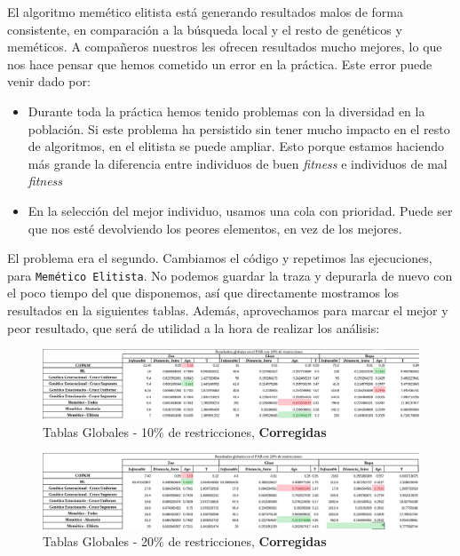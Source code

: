 \documentclass[11pt]{article}
\begin{document}
El algoritmo memético elitista está generando resultados malos de forma consistente, en comparación a la búsqueda local y el resto de genéticos y meméticos. A compañeros nuestros les ofrecen resultados mucho mejores, lo que nos hace pensar que hemos cometido un error en la práctica. Este error puede venir dado por:

\begin{itemize}
    \item Durante toda la práctica hemos tenido problemas con la diversidad en la población. Si este problema ha persistido sin tener mucho impacto en el resto de algoritmos, en el elitista se puede ampliar. Esto porque estamos haciendo más grande la diferencia entre individuos de buen \emph{fitness} e individuos de mal \emph{fitness}
    \item En la selección del mejor individuo, usamos una cola con prioridad. Puede ser que nos esté devolviendo los peores elementos, en vez de los mejores.
\end{itemize}

El problema era el segundo. Cambiamos el código y repetimos las ejecuciones, para \lstinline{Memético Elitista}. No podemos guardar la traza y depurarla de nuevo con el poco tiempo del que disponemos, así que directamente mostramos los resultados en la siguientes tablas. Además, aprovechamos para marcar el mejor y peor resultado, que será de utilidad a la hora de realizar los análisis:

\begin{figure}[H]
    \includegraphics[width=1.0\textwidth]{tablas_globales_corregidas_10}
    \caption{Tablas Globales - 10\% de restricciones, \textbf{Corregidas}}
\end{figure}

\begin{figure}[H]
    \includegraphics[width=1.0\textwidth]{tablas_globales_corregidas_20}
    \caption{Tablas Globales - 20\% de restricciones, \textbf{Corregidas}}
\end{figure}
\end{document}
